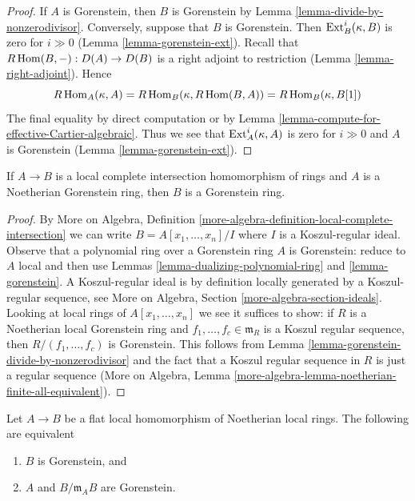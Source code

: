 \begin{proof}
If $A$ is Gorenstein, then $B$ is Gorenstein by
Lemma \ref{lemma-divide-by-nonzerodivisor}.
Conversely, suppose that $B$ is Gorenstein. Then
$\mathop{\mathrm{Ext}}\nolimits^i_B(\kappa, B)$ is zero for $i \gg 0$
(Lemma \ref{lemma-gorenstein-ext}).
Recall that $R\mathop{\mathrm{Hom}}\nolimits(B, -) : D(A) \to D(B)$ is a right adjoint
to restriction (Lemma \ref{lemma-right-adjoint}).
Hence
$$
R\mathop{\mathrm{Hom}}\nolimits_A(\kappa, A) = R\mathop{\mathrm{Hom}}\nolimits_B(\kappa, R\mathop{\mathrm{Hom}}\nolimits(B, A)) =
R\mathop{\mathrm{Hom}}\nolimits_B(\kappa, B[1])
$$
The final equality by direct computation or by
Lemma \ref{lemma-compute-for-effective-Cartier-algebraic}.
Thus we see that $\mathop{\mathrm{Ext}}\nolimits^i_A(\kappa, A)$ is zero for
$i \gg 0$ and $A$ is Gorenstein (Lemma \ref{lemma-gorenstein-ext}).
\end{proof}

\begin{lemma}
\label{lemma-gorenstein-lci}
If $A \to B$ is a local complete intersection homomorphism of rings and
$A$ is a Noetherian Gorenstein ring, then $B$ is a Gorenstein ring.
\end{lemma}

\begin{proof}
By More on Algebra, Definition
\ref{more-algebra-definition-local-complete-intersection}
we can write $B = A[x_1, \ldots, x_n]/I$
where $I$ is a Koszul-regular ideal. Observe that a polynomial
ring over a Gorenstein ring $A$ is Gorenstein: reduce to
$A$ local and then use Lemmas \ref{lemma-dualizing-polynomial-ring} and
\ref{lemma-gorenstein}.
A Koszul-regular ideal is by definition locally generated
by a Koszul-regular sequence, see More on Algebra, Section
\ref{more-algebra-section-ideals}.
Looking at local rings of $A[x_1, \ldots, x_n]$
we see it suffices to show: if $R$ is a Noetherian local
Gorenstein ring and $f_1, \ldots, f_c \in \mathfrak m_R$
is a Koszul regular sequence, then $R/(f_1, \ldots, f_c)$ is Gorenstein.
This follows from
Lemma \ref{lemma-gorenstein-divide-by-nonzerodivisor} and
the fact that a Koszul regular sequence in $R$ is just a
regular sequence (More on Algebra, Lemma
\ref{more-algebra-lemma-noetherian-finite-all-equivalent}).
\end{proof}

\begin{lemma}
\label{lemma-flat-under-gorenstein}
Let $A \to B$ be a flat local homomorphism of Noetherian local rings.
The following are equivalent
\begin{enumerate}
\item $B$ is Gorenstein, and
\item $A$ and $B/\mathfrak m_A B$ are Gorenstein.
\end{enumerate}
\end{lemma}

